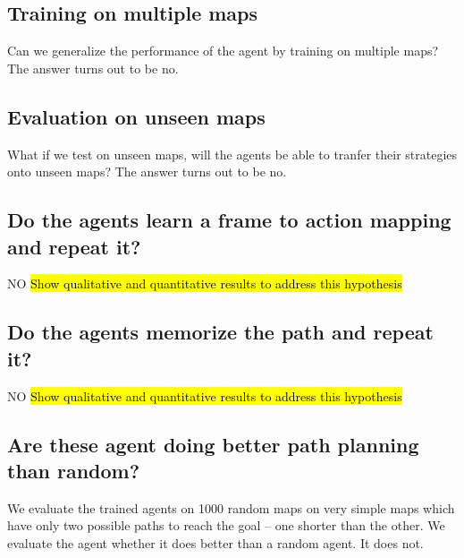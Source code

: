 \subsection{Training on multiple maps}
Can we generalize the performance of the agent by training on multiple maps? The answer turns out to be no.

\subsection{Evaluation on unseen maps}
What if we test on unseen maps, will the agents be able to tranfer their strategies onto unseen maps? The answer turns out to be no.

\subsection{Do the agents learn a frame to action mapping and repeat it?}
NO
\hl{Show qualitative and quantitative results to address this hypothesis}

\subsection{Do the agents memorize the path and repeat it?}
NO
\hl{Show qualitative and quantitative results to address this hypothesis}

\subsection{Are these agent doing better path planning than random?}
We evaluate the trained agents on 1000 random maps on very simple maps which have only two possible paths to reach the goal -- one shorter than the other. We evaluate the agent whether it does better than a random agent.
It does not.

